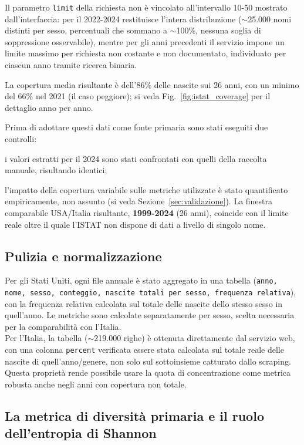 \documentclass[conference]{IEEEtran}
\begin{document}
Il parametro \texttt{limit} della richiesta non è
vincolato all'intervallo 10-50 mostrato dall'interfaccia: per il 2022-2024 restituisce l'intera
distribuzione ($\sim$25.000 nomi distinti per sesso, percentuali che sommano a $\sim$100\%, nessuna
soglia di soppressione osservabile), mentre per gli anni precedenti il servizio impone un limite
massimo per richiesta non costante e non documentato, individuato per ciascun anno tramite ricerca
binaria.

La copertura media risultante è dell'86\% delle nascite sui 26 anni, con un minimo del 66\% nel 2021
(il caso peggiore); si veda Fig.~\ref{fig:istat_coverage} per il dettaglio anno per anno. 

Prima di adottare questi dati come fonte primaria sono stati eseguiti due controlli: 

i valori estratti
per il 2024 sono stati
confrontati con quelli della raccolta manuale, risultando identici; 

l'impatto della copertura
variabile sulle metriche utilizzate è stato quantificato empiricamente, non assunto (si veda
Sezione~\ref{sec:validazione}). La finestra comparabile USA/Italia risultante, \textbf{1999-2024} (26
anni), coincide con il limite reale oltre il quale l'ISTAT non dispone di dati a livello di singolo
nome.



\subsection{Pulizia e normalizzazione}
Per gli Stati Uniti, ogni file annuale è stato aggregato in una tabella (\texttt{anno, nome, sesso,
conteggio, nascite totali per sesso, frequenza relativa}), con la frequenza relativa calcolata sul
totale delle nascite dello stesso sesso in quell'anno. Le metriche sono calcolate separatamente per
sesso, scelta necessaria per la comparabilità con l'Italia. \\
Per l'Italia, la tabella
($\sim$219.000 righe) è ottenuta direttamente dal servizio web, con una colonna \texttt{percent}
verificata essere stata calcolata sul totale reale delle nascite di quell'anno/genere, non solo sul
sottoinsieme catturato dallo scraping. \\
Questa proprietà rende possibile usare la quota di
concentrazione come metrica robusta anche negli anni con copertura non totale.

\subsection{La metrica di diversità primaria e il ruolo dell'entropia di Shannon}
\end{document}

